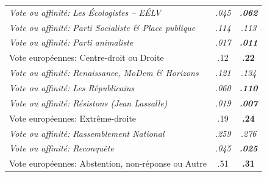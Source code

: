 \begin{tabular}[t]{lcc}
\textit{Vote ou affinité: Les Écologistes -- EÉLV} & \textit{.045} & \textit{\textbf{.062}} \\ %
\textit{Vote ou affinité: Parti Socialiste \& Place publique} & \textit{.114} & \textit{.113} \\ %
\textit{Vote ou affinité: Parti animaliste} & \textit{.017} & \textit{\textbf{.011}} \\ %
Vote européennes: Centre-droit ou Droite & .12 & \textbf{.22}\\
\textit{Vote ou affinité: Renaissance, MoDem \& Horizons} & \textit{.121} & \textit{.134} \\ %
\textit{Vote ou affinité: Les Républicains} & \textit{.060} & \textit{\textbf{.110}} \\ %
\textit{Vote ou affinité: Résistons (Jean Lassalle)} & \textit{.019} & \textit{\textbf{.007}} \\ %
Vote européennes: Extrême-droite & .19 & \textbf{.24}\\
\textit{Vote ou affinité: Rassemblement National} & \textit{.259} & \textit{.276} \\ %
\textit{Vote ou affinité: Reconquête} & \textit{.045} & \textit{\textbf{.025}} \\ %
Vote européennes: Abstention, non-réponse ou Autre & .51 & \textbf{.31}\\
\bottomrule
\end{tabular}